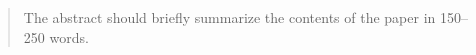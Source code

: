 \begin{abstract}
The abstract should briefly summarize the contents of the paper in
150--250 words.

\end{abstract}

